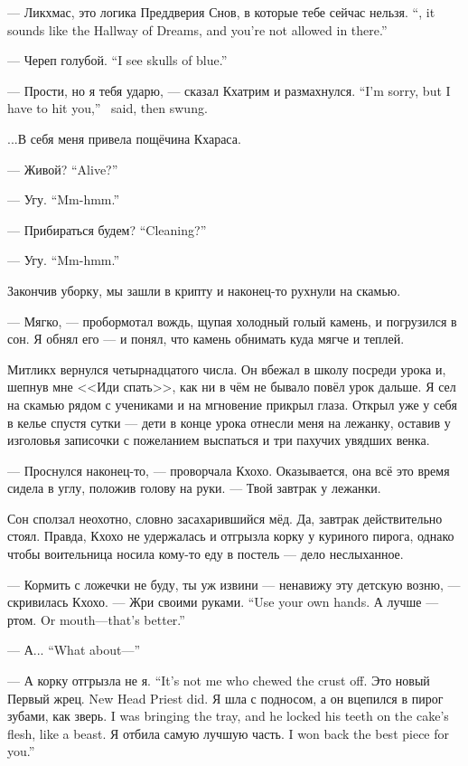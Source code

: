 {--- Ликхмас, это логика Преддверия Снов, в которые тебе сейчас нельзя.}
{``\Likchmas, it sounds like the Hallway of Dreams, and you're not allowed in there.''}

{--- Череп голубой.}
{``I see skulls of blue.''}

{--- Прости, но я тебя ударю, --- сказал Кхатрим и размахнулся.}
{``I'm sorry, but I have to hit you,'' \Kchatrim\ said, then swung.}

...В себя меня привела пощёчина Кхараса.

{--- Живой?}
{``Alive?''}

{--- Угу.}
{``Mm-hmm.''}

{--- Прибираться будем?}
{``Cleaning?''}

{--- Угу.}
{``Mm-hmm.''}

Закончив уборку, мы зашли в крипту и наконец-то рухнули на скамью.

--- Мягко, --- пробормотал вождь, щупая холодный голый камень, и погрузился в сон.
Я обнял его --- и понял, что камень обнимать куда мягче и теплей.

Митликх вернулся четырнадцатого числа.
Он вбежал в школу посреди урока и, шепнув мне <<Иди спать>>, как ни в чём не бывало повёл урок дальше.
Я сел на скамью рядом с учениками и на мгновение прикрыл глаза.
Открыл уже у себя в келье спустя сутки --- дети в конце урока отнесли меня на лежанку, оставив у изголовья записочки с пожеланием выспаться и три пахучих увядших венка.

--- Проснулся наконец-то, --- проворчала Кхохо.
Оказывается, она всё это время сидела в углу, положив голову на руки.
--- Твой завтрак у лежанки.

Сон сползал неохотно, словно засахарившийся мёд.
Да, завтрак действительно стоял.
Правда, Кхохо не удержалась и отгрызла корку у куриного пирога, однако чтобы воительница носила кому-то еду в постель --- дело неслыханное.

--- Кормить с ложечки не буду, ты уж извини --- ненавижу эту детскую возню, --- скривилась Кхохо.
{--- Жри своими руками.}
{``Use your own hands.}
{А лучше --- ртом.}
{Or mouth---that's better.''}

{--- А...}
{``What about---''}

{--- А корку отгрызла не я.}
{``It's not me who chewed the crust off.}
{Это новый Первый жрец.}
{New Head Priest did.}
{Я шла с подносом, а он вцепился в пирог зубами, как зверь.}
{I was bringing the tray, and he locked his teeth on the cake's flesh, like a beast.}
{Я отбила самую лучшую часть.}
{I won back the best piece for you.''}

